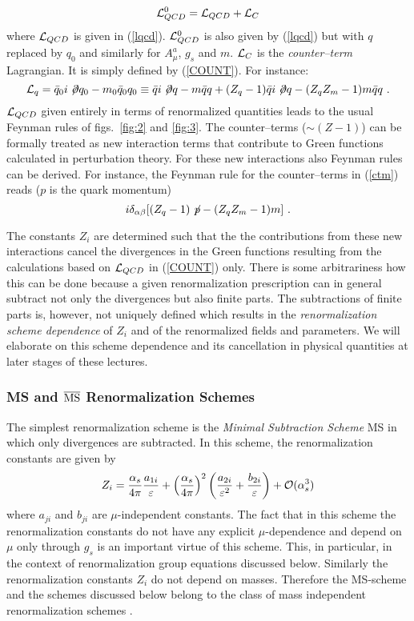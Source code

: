 \documentclass[12pt,rotate]{article}
\newcommand{\eqn}{\ref}
\newcommand{\be}{\begin{equation}}
\newcommand{\ee}{\end{equation}}
\begin{document}
\begin{itemize}
\be\label{COUNT}
{\cal L}^0_{QCD}={\cal L}_{QCD}+{\cal L}_C
\ee
where ${\cal L}_{QCD}$ is given in (\ref{lqcd}). ${\cal L}^0_{QCD}$ is
also given by (\ref{lqcd}) but with $q$ replaced by $q_0$ and similarly
for $A^a_\mu$, $g_s$ and $m$. ${\cal L}_C$ is the {\it counter--term}
Lagrangian. It is simply defined by
(\ref{COUNT}).
For instance:
\begin{equation}\label{ctm}
{\cal L}_q=\bar q_0 i\not\!\partial q_0-m_0\bar q_0 q_0\equiv
\bar q i\not\!\partial q-m\bar q q+(Z_q-1)\bar q i\not\!\partial q-
(Z_q Z_m-1)m\bar q q~.
\end{equation}
${\cal L}_{QCD}$ given entirely in terms of
renormalized quantities leads to the usual Feynman rules of 
figs.\ \ref{fig:2} and \ref{fig:3}.
The counter--terms ($\sim(Z-1)$) can be formally
treated as new interaction terms that contribute
to Green functions calculated in perturbation theory. 
For these new interactions also Feynman rules can be derived.
For instance, the Feynman rule for the counter--terms in (\eqn{ctm}) reads
($p$ is the quark momentum)
\begin{equation}\label{ctex}
i\delta_{\alpha\beta}\lbrack(Z_q-1)\not\! p - (Z_q Z_m-1) m\rbrack~.   
\end{equation}

The constants $Z_i$ are  determined such that the the contributions
from these new interactions cancel the
divergences in the Green functions resulting from the calculations
based on ${\cal L}_{QCD}$ in (\ref{COUNT}) only.
There is some arbitrariness how this can be done because a given
renormalization prescription can in general subtract not only the
divergences but also finite parts. The subtractions of finite
parts is, however, not uniquely defined which results in  the 
{\it renormalization scheme dependence} of $Z_i$ and of the
renormalized fields and parameters. We will elaborate on this
scheme dependence and its cancellation in physical quantities 
at later stages of these lectures.

\subsubsection{MS and $\overline{\bf \rm MS}$ Renormalization Schemes}
The simplest renormalization scheme is the {\it Minimal Subtraction
Scheme} MS  \cite{HV1} 
in which only divergences are subtracted. In this scheme,
the renormalization constants are given by
\begin{equation}\label{zms}
Z_i = \frac{\alpha_s}{4\pi}\frac{a_{1i}}{\varepsilon} 
+\left(\frac{\alpha_s}{4\pi}\right)^2
 \left(\frac{a_{2i}}{\varepsilon^2}+
 \frac{b_{2i}}{\varepsilon}\right)+{\cal O}(\alpha_s^3) 
\end{equation}
where $a_{ji}$ and $b_{ji}$ are $\mu$-independent constants.
The fact that in this scheme the renormalization constants
do not have any explicit $\mu$-dependence and depend on $\mu$
only through $g_s$ is an important virtue of this scheme.
This, in particular, in the context of renormalization group
equations discussed below. Similarly the renormalization constants
$Z_i$ do not depend on masses. Therefore the MS-scheme and the
schemes discussed below belong to the class of mass independent
renormalization schemes \cite{Weinberg}.


\end{itemize}
\end{document}
